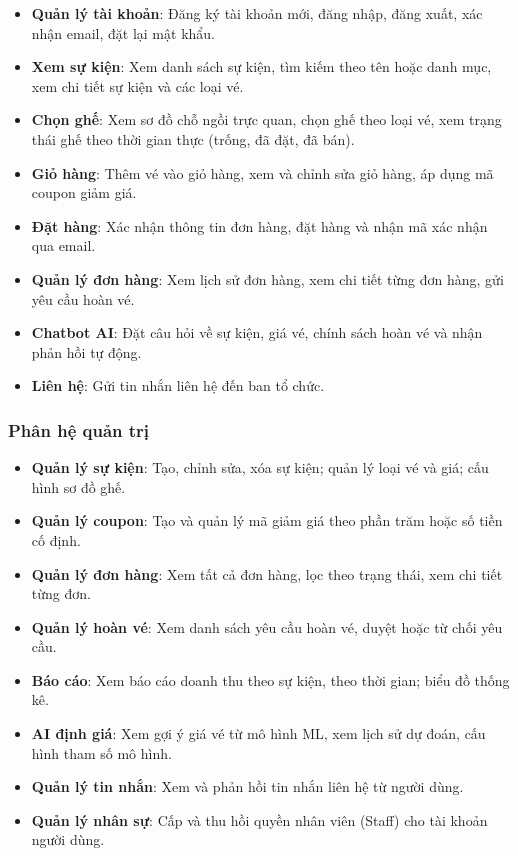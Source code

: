 \documentclass[../main.tex]{subfiles}
\begin{document}
\begin{itemize}
    \item \textbf{Quản lý tài khoản}: Đăng ký tài khoản mới, đăng nhập, đăng xuất, xác nhận email, đặt lại mật khẩu.
    \item \textbf{Xem sự kiện}: Xem danh sách sự kiện, tìm kiếm theo tên hoặc danh mục, xem chi tiết sự kiện và các loại vé.
    \item \textbf{Chọn ghế}: Xem sơ đồ chỗ ngồi trực quan, chọn ghế theo loại vé, xem trạng thái ghế theo thời gian thực (trống, đã đặt, đã bán).
    \item \textbf{Giỏ hàng}: Thêm vé vào giỏ hàng, xem và chỉnh sửa giỏ hàng, áp dụng mã coupon giảm giá.
    \item \textbf{Đặt hàng}: Xác nhận thông tin đơn hàng, đặt hàng và nhận mã xác nhận qua email.
    \item \textbf{Quản lý đơn hàng}: Xem lịch sử đơn hàng, xem chi tiết từng đơn hàng, gửi yêu cầu hoàn vé.
    \item \textbf{Chatbot AI}: Đặt câu hỏi về sự kiện, giá vé, chính sách hoàn vé và nhận phản hồi tự động.
    \item \textbf{Liên hệ}: Gửi tin nhắn liên hệ đến ban tổ chức.
\end{itemize}

\subsubsection{Phân hệ quản trị}

\begin{itemize}
    \item \textbf{Quản lý sự kiện}: Tạo, chỉnh sửa, xóa sự kiện; quản lý loại vé và giá; cấu hình sơ đồ ghế.
    \item \textbf{Quản lý coupon}: Tạo và quản lý mã giảm giá theo phần trăm hoặc số tiền cố định.
    \item \textbf{Quản lý đơn hàng}: Xem tất cả đơn hàng, lọc theo trạng thái, xem chi tiết từng đơn.
    \item \textbf{Quản lý hoàn vé}: Xem danh sách yêu cầu hoàn vé, duyệt hoặc từ chối yêu cầu.
    \item \textbf{Báo cáo}: Xem báo cáo doanh thu theo sự kiện, theo thời gian; biểu đồ thống kê.
    \item \textbf{AI định giá}: Xem gợi ý giá vé từ mô hình ML, xem lịch sử dự đoán, cấu hình tham số mô hình.
    \item \textbf{Quản lý tin nhắn}: Xem và phản hồi tin nhắn liên hệ từ người dùng.
    \item \textbf{Quản lý nhân sự}: Cấp và thu hồi quyền nhân viên (Staff) cho tài khoản người dùng.
\end{itemize}
\end{document}

